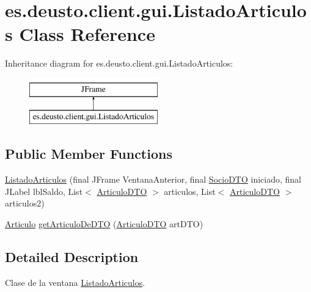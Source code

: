 \hypertarget{classes_1_1deusto_1_1client_1_1gui_1_1_listado_articulos}{}\section{es.\+deusto.\+client.\+gui.\+Listado\+Articulos Class Reference}
\label{classes_1_1deusto_1_1client_1_1gui_1_1_listado_articulos}
Inheritance diagram for es.\+deusto.\+client.\+gui.\+Listado\+Articulos\+:\begin{figure}[H]
\begin{center}
\leavevmode
\includegraphics[height=2.000000cm]{classes_1_1deusto_1_1client_1_1gui_1_1_listado_articulos}
\end{center}
\end{figure}
\subsection*{Public Member Functions}
\begin{DoxyCompactItemize}
\item 
\mbox{\hyperlink{classes_1_1deusto_1_1client_1_1gui_1_1_listado_articulos_a990ab9d95375996edfa2f03c74c45b9b}{Listado\+Articulos}} (final J\+Frame Ventana\+Anterior, final \mbox{\hyperlink{classes_1_1deusto_1_1server_1_1dto_1_1_socio_d_t_o}{Socio\+D\+TO}} iniciado, final J\+Label lbl\+Saldo, List$<$ \mbox{\hyperlink{classes_1_1deusto_1_1server_1_1dto_1_1_articulo_d_t_o}{Articulo\+D\+TO}} $>$ articulos, List$<$ \mbox{\hyperlink{classes_1_1deusto_1_1server_1_1dto_1_1_articulo_d_t_o}{Articulo\+D\+TO}} $>$ articulos2)
\item 
\mbox{\hyperlink{classes_1_1deusto_1_1client_1_1data_1_1_articulo}{Articulo}} \mbox{\hyperlink{classes_1_1deusto_1_1client_1_1gui_1_1_listado_articulos_a69c1800922a3b247d59ad6e998aa129b}{get\+Articulo\+De\+D\+TO}} (\mbox{\hyperlink{classes_1_1deusto_1_1server_1_1dto_1_1_articulo_d_t_o}{Articulo\+D\+TO}} art\+D\+TO)
\end{DoxyCompactItemize}


\subsection{Detailed Description}
Clase de la ventana \mbox{\hyperlink{classes_1_1deusto_1_1client_1_1gui_1_1_listado_articulos}{Listado\+Articulos}}. 

